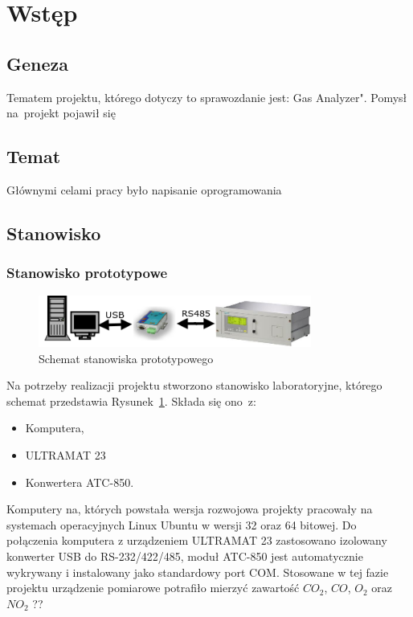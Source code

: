 \section{Wstęp}

\subsection{Geneza}
Tematem projektu, którego dotyczy to sprawozdanie jest: Gas Analyzer". Pomysł na~projekt pojawił się 

\subsection{Temat}
Głównymi celami pracy było napisanie oprogramowania

\subsection{Stanowisko}
\subsubsection{Stanowisko prototypowe}
\begin{figure}[!htb] 	\centering 	\includegraphics[width=0.8\textwidth]{images/schemat1} 	\caption{Schemat stanowiska prototypowego} \label{schemat1} \end{figure} 
Na potrzeby realizacji projektu stworzono stanowisko laboratoryjne, którego schemat przedstawia Rysunek~\ref{schemat1}. Składa się ono~z:
\begin{itemize}
\item Komputera,
\item ULTRAMAT 23
\item Konwertera ATC-850.
\end{itemize}
\indent
\indent Komputery na, których powstała wersja rozwojowa projekty pracowały na systemach operacyjnych Linux Ubuntu w wersji 32 oraz 64 bitowej. Do połączenia komputera z urządzeniem ULTRAMAT 23 zastosowano izolowany konwerter USB do RS-232/422/485, moduł ATC-850 jest automatycznie wykrywany i instalowany jako standardowy port COM. Stosowane w tej fazie projektu urządzenie pomiarowe potrafiło mierzyć zawartość $ CO_2 $, $ CO $, $ O_2 $ oraz $ NO_2 $ ??

